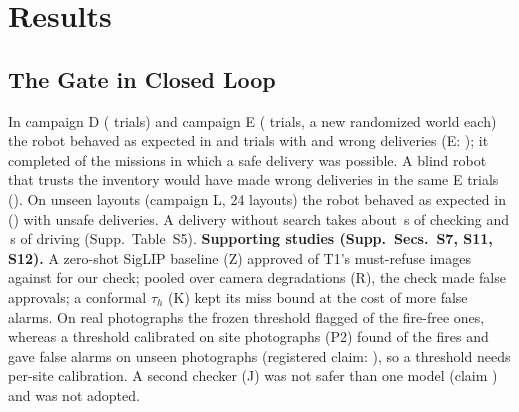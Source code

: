 \documentclass[conference]{IEEEtran}
\newcommand{\tauh}{\tau_{h}}
\begin{document}
\section{Results}\label{sec:results}
\subsection{The Gate in Closed Loop}\label{sec:res-gate}
In campaign D (\DN{} trials) and campaign E (\EN{} trials, a new randomized world each) the robot behaved as expected in \DCorrect{} and \ECorrect{} trials with \DWrong{} and \EWrong{} wrong deliveries (E: \EWrongCI); it completed \ETaskSuccess{} of the \ESafeN{} missions in which a safe delivery was possible. A blind robot that trusts the inventory would have made \EBzeroWrong{} wrong deliveries in the same E trials (\EBzeroWrongCI). On unseen layouts (campaign L, 24 layouts) the robot behaved as expected in \LCorrect{} (\LCorrectCI) with \LUnsafe{} unsafe deliveries. A delivery without search takes about \TimCheck\,s of checking and \TimDrive\,s of driving (Supp.~Table~S5).
\textbf{Supporting studies (Supp.~Secs.~S7, S11, S12).} A zero-shot SigLIP baseline (Z) approved \ZSigTOneFA{} of T1's must-refuse images against \ZOursTOneFA{} for our check; pooled over \RNcond{} camera degradations (R), the check made \RPoolFA{} false approvals; a conformal $\tauh$ (K) kept its miss bound at the cost of more false alarms. On real photographs the frozen threshold flagged \PFalseAlarm{} of the fire-free ones, whereas a threshold calibrated on site photographs (P2) found \PTwoRecall{} of the fires and gave \PTwoFA{} false alarms on unseen photographs (registered claim: \PTwoClaim{}), so a threshold needs per-site calibration. A second checker (J) was not safer than one model (claim \JClaim) and was not adopted.
\end{document}
